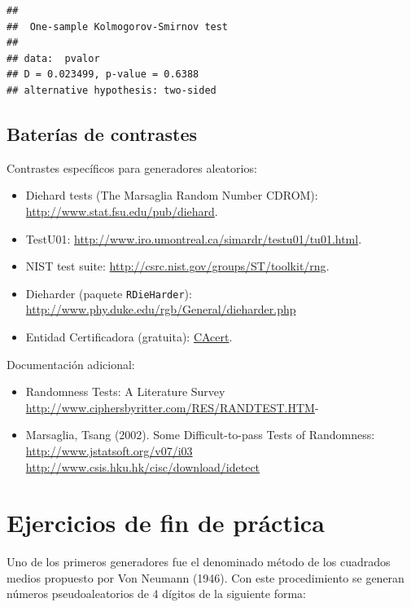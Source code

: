 \documentclass[]{book}
\theoremstyle{definition}
\theoremstyle{definition}
\theoremstyle{definition}
\theoremstyle{remark}
\let\BeginKnitrBlock\begin \let\EndKnitrBlock\end
\begin{document}
\begin{verbatim}
## 
##  One-sample Kolmogorov-Smirnov test
## 
## data:  pvalor
## D = 0.023499, p-value = 0.6388
## alternative hypothesis: two-sided
\end{verbatim}

\subsection{Baterías de contrastes}\label{baterias-de-contrastes}

Contrastes específicos para generadores aleatorios:

\begin{itemize}
\item
  Diehard tests (The Marsaglia Random Number CDROM):
  \url{http://www.stat.fsu.edu/pub/diehard}.
\item
  TestU01: \url{http://www.iro.umontreal.ca/simardr/testu01/tu01.html}.
\item
  NIST test suite: \url{http://csrc.nist.gov/groups/ST/toolkit/rng}.
\item
  Dieharder (paquete \texttt{RDieHarder}):
  \url{http://www.phy.duke.edu/rgb/General/dieharder.php}
\item
  Entidad Certificadora (gratuita):
  \href{http://www.cacert.at/random}{CAcert}.
\end{itemize}

Documentación adicional:

\begin{itemize}
\item
  Randomness Tests: A Literature Survey
  \url{http://www.ciphersbyritter.com/RES/RANDTEST.HTM}-
\item
  Marsaglia, Tsang (2002). Some Difficult-to-pass Tests of Randomness:
  \url{http://www.jstatsoft.org/v07/i03}\\
  \url{http://www.csis.hku.hk/cisc/download/idetect}
\end{itemize}

\section{Ejercicios de fin de
práctica}\label{ejercicios-de-fin-de-practica}

\BeginKnitrBlock{exercise}
\protect\hypertarget{exr:unnamed-chunk-24}{}{\label{exr:unnamed-chunk-24} }
\EndKnitrBlock{exercise} Uno de los primeros generadores fue el
denominado método de los cuadrados medios propuesto por Von Neumann
(1946). Con este procedimiento se generan números pseudoaleatorios de 4
dígitos de la siguiente forma:
\end{document}
